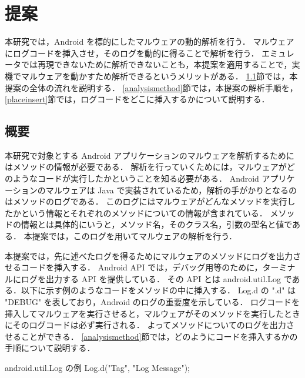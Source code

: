 \section{提案}
本研究では，Android を標的にしたマルウェアの動的解析を行う．
マルウェアにログコードを挿入させ，そのログを動的に得ることで解析を行う．
エミュレータでは再現できないために解析できないことも，本提案を適用することで，実機でマルウェアを動かすため解析できるというメリットがある．
\ref{overview}節では，本提案の全体の流れを説明する．
\ref{analysismethod}節では，本提案の解析手順を，\ref{placeinsert}節では，ログコードをどこに挿入するかについて説明する．

\subsection{概要}
\label{overview}
本研究で対象とする Android アプリケーションのマルウェアを解析するためにはメソッドの情報が必要である．
解析を行っていくためには，マルウェアがどのようなコードが実行したかということを知る必要がある．
Android アプリケーションのマルウェアは Java で実装されているため，解析の手がかりとなるのはメソッドのログである．
このログにはマルウェアがどんなメソッドを実行したかという情報とそれぞれのメソッドについての情報が含まれている．
メソッドの情報とは具体的にいうと，メソッド名，そのクラス名，引数の型名と値である．
本提案では，このログを用いてマルウェアの解析を行う．

本提案では，先に述べたログを得るためにマルウェアのメソッドにログを出力させるコードを挿入する．
Android API では，デバッグ用等のために，ターミナルにログを出力する API を提供している．
その API とは android.util.Log である．以下に示す例のようなコードをメソッドの中に挿入する．
Log.d の ".d" は "DEBUG" を表しており，Android のログの重要度を示している．
ログコードを挿入してマルウェアを実行させると，マルウェアがそのメソッドを実行したときにそのログコードは必ず実行される．
よってメソッドについてのログを出力させることができる．
 \ref{analysismethod}節では，どのようにコードを挿入するかの手順について説明する．

\begin{itembox}[c]{android.util.Log の例}
	Log.d("Tag", "Log Message");
\end{itembox}

